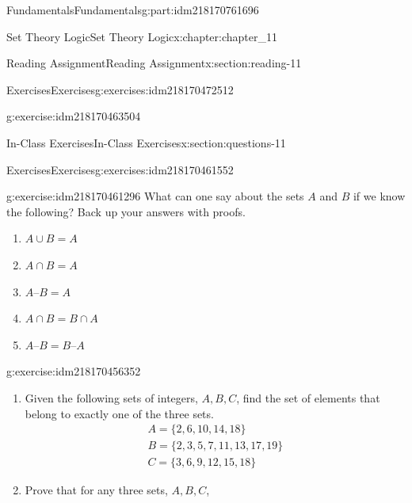 \documentclass[oneside,10pt,]{book}
\numberwithin{equation}{section}
\begin{document}
\begin{partptx}{Fundamentals}{}{Fundamentals}{}{}{g:part:idm218170761696}
\begin{chapterptx}{Set Theory Logic}{}{Set Theory Logic}{}{}{x:chapter:chapter_11}
\begin{sectionptx}{Reading Assignment}{}{Reading Assignment}{}{}{x:section:reading-11}
\begin{exercises-subsection-numberless}{Exercises}{}{Exercises}{}{}{g:exercises:idm218170472512}
\begin{exercisegroup}
\begin{divisionexerciseeg}{2}{}{}{g:exercise:idm218170463504}
%
\end{divisionexerciseeg}%
\end{exercisegroup}
\par\medskip\noindent
\end{exercises-subsection-numberless}
\end{sectionptx}
%
%
\typeout{************************************************}
\typeout{************************************************}
%
\begin{sectionptx}{In-Class Exercises}{}{In-Class Exercises}{}{}{x:section:questions-11}
%
%
%
\typeout{************************************************}
\typeout{************************************************}
%
\begin{exercises-subsection-numberless}{Exercises}{}{Exercises}{}{}{g:exercises:idm218170461552}
\par\medskip\noindent%
%
\begin{exercisegroup}
\begin{divisionexerciseeg}{1}{}{}{g:exercise:idm218170461296}%
What can one say about the sets \(A\) and \(B\) if we know the following?  Back up your answers with proofs.%
\begin{enumerate}[label=(\alph*)]
\item{}\(\displaystyle A \cup B = A\)%
\item{}\(\displaystyle A\cap B = A\)%
\item{}\(\displaystyle A–B = A\)%
\item{}\(\displaystyle A\cap B = B\cap A\)%
\item{}\(\displaystyle A–B = B–A\)%
\end{enumerate}
%
\end{divisionexerciseeg}%
\begin{divisionexerciseeg}{2}{}{}{g:exercise:idm218170456352}%
%
\begin{enumerate}[label=(\alph*)]
\item{}Given the following sets of integers, \(A, B, C\), find the set of elements that belong to exactly one of the three sets.%
\begin{gather*}
A=\{2,6,10,14,18\}\\
B=\{2,3,5,7,11,13,17,19\}\\
C=\{3,6,9,12,15,18\}
\end{gather*}
%
\item{}Prove that for any three sets, \(A, B, C\),%
\begin{equation*}

\end{equation*}
\end{enumerate}
\end{divisionexerciseeg}
\end{exercisegroup}
\end{exercises-subsection-numberless}
\end{sectionptx}
\end{chapterptx}
\end{partptx}
\end{document}
